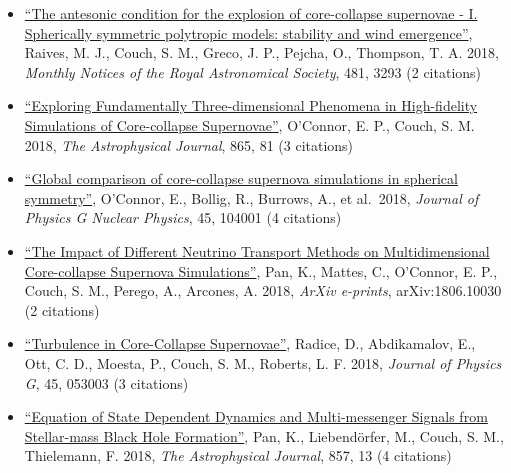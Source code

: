 \documentclass[12pt,titlepage]{article}
\begin{document}
\begin{itemize}
  \item \href{https://ui.adsabs.harvard.edu/#abs/2018MNRAS.481.3293R/abstract}{``The antesonic condition for the explosion of core-collapse supernovae - I. Spherically symmetric polytropic models: stability and wind emergence''}, Raives, M. J., Couch, S. M., Greco, J. P., Pejcha, O., Thompson, T. A. 2018, {\itshape Monthly Notices of the Royal Astronomical Society}, 481, 3293 (2 citations)

\item \href{https://ui.adsabs.harvard.edu/#abs/2018ApJ...865...81O/abstract}{``Exploring Fundamentally Three-dimensional Phenomena in High-fidelity Simulations of Core-collapse Supernovae''}, O’Connor, E. P., Couch, S. M. 2018, {\itshape The Astrophysical Journal}, 865, 81 (3 citations)

\item \href{https://ui.adsabs.harvard.edu/#abs/2018JPhG...45j4001O/abstract}{``Global comparison of core-collapse supernova simulations in spherical symmetry''}, O’Connor, E., Bollig, R., Burrows, A., et al.\ 2018, {\itshape Journal of Physics G Nuclear Physics}, 45, 104001 (4 citations)

\item \href{https://ui.adsabs.harvard.edu/#abs/2018arXiv180610030P/abstract}{``The Impact of Different Neutrino Transport Methods on Multidimensional Core-collapse Supernova Simulations''}, Pan, K., Mattes, C., O'Connor, E. P., Couch, S. M., Perego, A., Arcones, A. 2018, {\itshape ArXiv e-prints}, arXiv:1806.10030 (2 citations)
  \item \href{http://adsabs.harvard.edu/abs/2018JPhG...45e3003R}{``Turbulence in Core-Collapse Supernovae''}, Radice, D., Abdikamalov, E., Ott, C. D., Moesta, P., Couch, S. M., Roberts, L. F. 2018, {\itshape Journal of Physics G}, 45, 053003 (3 citations)
  \item \href{https://ui.adsabs.harvard.edu/#abs/2018ApJ...857...13P/abstract}{``Equation of State Dependent Dynamics and Multi-messenger Signals from Stellar-mass Black Hole Formation''}, Pan, K., Liebend\"orfer, M., Couch, S. M., Thielemann, F. 2018, {\itshape The Astrophysical Journal}, 857, 13 (4 citations)
\end{itemize}

\end{document}
